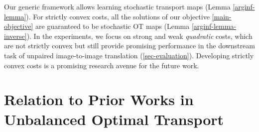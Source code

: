 \documentclass{article} %
\begin{document}
Our generic framework allows learning stochastic transport maps (Lemma \ref{arginf-lemma}). For strictly convex costs, all the solutions of our objective \eqref{main-objective} are guaranteed to be stochastic OT maps (Lemma \ref{arginf-lemma-inverse}). In the experiments, we focus on strong and weak \textit{quadratic} costs, which are not strictly convex but still provide promising performance in the downstream task of unpaired image-to-image translation (\wasyparagraph\ref{sec-evaluation}). Developing strictly convex costs is a promising research avenue for the future work.


\section{Relation to Prior Works in Unbalanced Optimal Transport}
\label{sec-unbalanced-ot}
\end{document}
